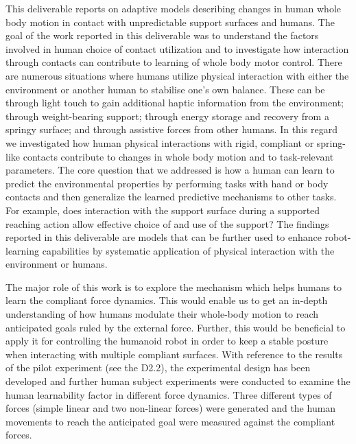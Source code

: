 \documentclass[12pt,a4paper,twoside]{article}
\begin{document}
This deliverable reports on adaptive models describing changes in human whole body motion in contact with unpredictable support surfaces and humans. The goal of the work reported in this deliverable was to understand the factors involved in human choice of contact utilization and to investigate how interaction through contacts can contribute to learning of whole body motor control. There are numerous situations where humans utilize physical interaction with either the environment or another human to stabilise one’s own balance. These can be through light touch to gain additional haptic information from the environment; through weight-bearing support; through energy storage and recovery from a springy surface; and through assistive forces from other humans. In this regard we investigated how human physical interactions with rigid, compliant or spring-like contacts contribute to changes in whole body motion and to task-relevant parameters. The core question that we addressed is how a human can learn to predict the environmental properties by performing tasks with hand or body contacts and then generalize the learned predictive mechanisms to other tasks. For example, does interaction with the support surface during a supported reaching action allow effective choice of and use of the support? The findings reported in this deliverable are models that can be further used to enhance robot-learning capabilities by systematic application of physical interaction with the environment or humans.



The major role of this work is to explore the mechanism which helps humans to learn the compliant force dynamics. This would enable us to get an in-depth understanding of how humans modulate their whole-body motion to reach anticipated goals ruled by the external force. Further, this would be beneficial to apply it for controlling the humanoid robot in order to keep a stable posture when interacting with multiple compliant surfaces. With reference to the results of the pilot experiment (see the D2.2), the experimental design has been developed and further human subject experiments were conducted to examine the human learnability factor in different force dynamics. Three different types of forces (simple linear and two non-linear forces) were generated and the human movements to reach the anticipated goal were measured against the compliant forces.
\end{document}
